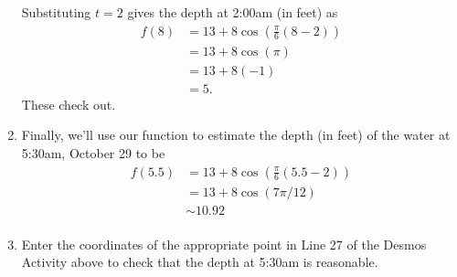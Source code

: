\documentclass{ximera}
\begin{document}
\begin{example}
\begin{explanation}
\begin{enumerate}
Substituting $t=2$ gives the depth at 2:00am (in feet) as
\begin{align*}
   f(8)   & = 13 + 8 \cos \left(  \frac{\pi}{6} \left(8 - 2 \right) \right) \\ 
           & = 13 + 8 \cos (\pi)  \\ 
           & = 13 + 8(-1) \\
           & = 5 .
\end{align*}
These check out.

\item Finally, we'll use our function to estimate the depth (in feet) of the water at 5:30am, October 29 to be
\begin{align*}
   f(5.5)   & = 13 + 8 \cos \left(  \frac{\pi}{6} \left(5.5 - 2 \right) \right) \\ 
           & = 13 + 8 \cos (7\pi / 12)  \\ 
           &  \sim  10.92 \\
         \end{align*}

\item Enter the coordinates of the appropriate point in Line 27 of the Desmos Activity above to check that the depth at 5:30am is reasonable.

\end{enumerate}

\end{explanation}

\end{example}
\end{document}

